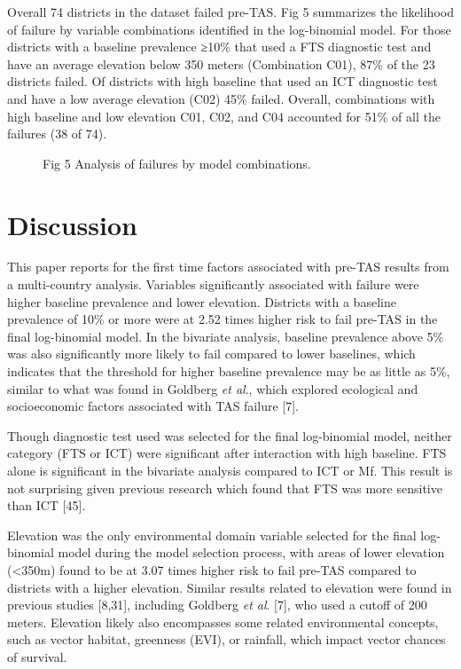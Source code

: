 \documentclass[11pt,a4paper]{article}
\begin{document}
Overall 74 districts in the dataset failed pre-TAS. Fig 5 summarizes the likelihood of failure by variable combinations identified in the log-binomial model. For those districts with a baseline prevalence ≥10\% that used a FTS diagnostic test and have an average elevation below 350 meters (Combination C01), 87\% of the 23 districts failed. Of districts with high baseline that used an ICT diagnostic test and have a low average elevation (C02) 45\% failed. Overall, combinations with high baseline and low elevation C01, C02, and C04 accounted for 51\% of all the failures (38 of 74).

\begin{figure}[h]
\caption{Fig 5 Analysis of failures by model combinations.}
\end{figure}

\section{Discussion}

This paper reports for the first time factors associated with pre-TAS results from a multi-country analysis. Variables significantly associated with failure were higher baseline prevalence and lower elevation. Districts with a baseline prevalence of 10\% or more were at 2.52 times higher risk to fail pre-TAS in the final log-binomial model. In the bivariate analysis, baseline prevalence above 5\% was also significantly more likely to fail compared to lower baselines, which indicates that the threshold for higher baseline prevalence may be as little as 5\%, similar to what was found in Goldberg \textit{et al}., which explored ecological and socioeconomic factors associated with TAS failure [7].

Though diagnostic test used was selected for the final log-binomial model, neither category (FTS or ICT) were significant after interaction with high baseline. FTS alone is significant in the bivariate analysis compared to ICT or Mf. This result is not surprising given previous research which found that FTS was more sensitive than ICT [45].

Elevation was the only environmental domain variable selected for the final log-binomial model during the model selection process, with areas of lower elevation (<350m) found to be at 3.07 times higher risk to fail pre-TAS compared to districts with a higher elevation. Similar results related to elevation were found in previous studies [8,31], including Goldberg \textit{et al}. [7], who used a cutoff of 200 meters. Elevation likely also encompasses some related environmental concepts, such as vector habitat, greenness (EVI), or rainfall, which impact vector chances of survival.
\end{document}
